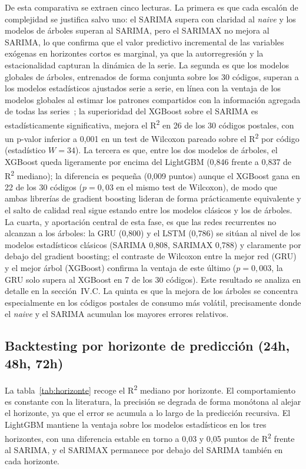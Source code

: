\documentclass[12pt, a4paper]{article}
\begin{document}
De esta comparativa se extraen cinco lecturas. La primera es que cada escalón de complejidad se justifica salvo uno: el SARIMA supera con claridad al \textit{naive} y los modelos de árboles superan al SARIMA, pero el SARIMAX no mejora al SARIMA, lo que confirma que el valor predictivo incremental de las variables exógenas en horizontes cortos es marginal, ya que la autorregresión y la estacionalidad capturan la dinámica de la serie. La segunda es que los modelos globales de árboles, entrenados de forma conjunta sobre los 30 códigos, superan a los modelos estadísticos ajustados serie a serie, en línea con la ventaja de los modelos globales al estimar los patrones compartidos con la información agregada de todas las series~\cite{montero2021}; la superioridad del XGBoost sobre el SARIMA es estadísticamente significativa, mejora el R\textsuperscript{2} en 26 de los 30 códigos postales, con un p-valor inferior a 0,001 en un test de Wilcoxon pareado sobre el R\textsuperscript{2} por código (estadístico $W=34$). La tercera es que, entre los dos modelos de árboles, el XGBoost queda ligeramente por encima del LightGBM (0,846 frente a 0,837 de R\textsuperscript{2} mediano); la diferencia es pequeña (0,009 puntos) aunque el XGBoost gana en 22 de los 30 códigos ($p=0{,}03$ en el mismo test de Wilcoxon), de modo que ambas librerías de gradient boosting lideran de forma prácticamente equivalente y el salto de calidad real sigue estando entre los modelos clásicos y los de árboles. La cuarta, y aportación central de esta fase, es que las redes recurrentes no alcanzan a los árboles: la GRU (0,800) y el LSTM (0,786) se sitúan al nivel de los modelos estadísticos clásicos (SARIMA 0,808, SARIMAX 0,788) y claramente por debajo del gradient boosting; el contraste de Wilcoxon entre la mejor red (GRU) y el mejor árbol (XGBoost) confirma la ventaja de este último ($p=0{,}003$, la GRU solo supera al XGBoost en 7 de los 30 códigos). Este resultado se analiza en detalle en la sección~IV.C. La quinta es que la mejora de los árboles se concentra especialmente en los códigos postales de consumo más volátil, precisamente donde el \textit{naive} y el SARIMA acumulan los mayores errores relativos.

\subsection{Backtesting por horizonte de predicción (24h, 48h, 72h)}

La tabla~\ref{tab:horizonte} recoge el R\textsuperscript{2} mediano por horizonte. El comportamiento es constante con la literatura, la precisión se degrada de forma monótona al alejar el horizonte, ya que el error se acumula a lo largo de la predicción recursiva. El LightGBM mantiene la ventaja sobre los modelos estadísticos en los tres horizontes, con una diferencia estable en torno a 0,03 y 0,05 puntos de R\textsuperscript{2} frente al SARIMA, y el SARIMAX permanece por debajo del SARIMA también en cada horizonte.
\end{document}
